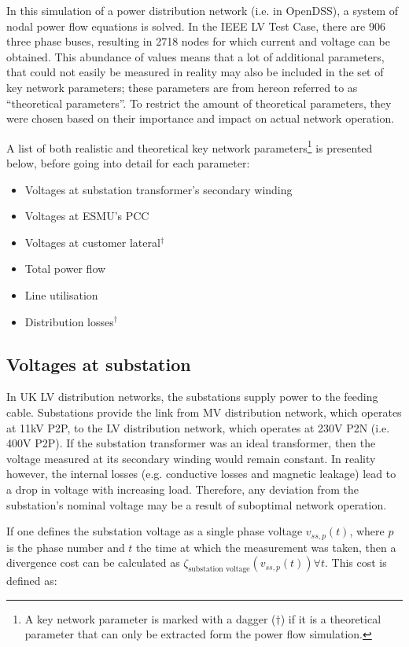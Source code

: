 In this simulation of a power distribution network (i.e. in OpenDSS), a system of nodal power flow equations is solved.
In the IEEE LV Test Case, there are 906 three phase buses, resulting in 2718 nodes for which current and voltage can be obtained.
This abundance of values means that a lot of additional parameters, that could not easily be measured in reality may also be included in the set of key network parameters; these parameters are from hereon referred to as ``theoretical parameters''.
To restrict the amount of theoretical parameters, they were chosen based on their importance and impact on actual network operation.

A list of both realistic and theoretical key network parameters\footnote{A key network parameter is marked with a dagger ($\dagger$) if it is a theoretical parameter that can only be extracted form the power flow simulation.} is presented below, before going into detail for each parameter:

\begin{itemize}
	\item Voltages at substation transformer's secondary winding
	\item Voltages at ESMU's PCC
	\item Voltages at customer lateral$^{\dagger}$
	\item Total power flow
	\item Line utilisation
	\item Distribution losses$^{\dagger}$
\end{itemize}

\subsection{Voltages at substation}
\label{ch1:subsec:voltages-at-substation}

In UK LV distribution networks, the substations supply power to the feeding cable.
Substations provide the link from MV distribution network, which operates at 11kV P2P, to the LV distribution network, which operates at 230V P2N (i.e. 400V P2P).
If the substation transformer was an ideal transformer, then the voltage measured at its secondary winding would remain constant.
In reality however, the internal losses (e.g. conductive losses and magnetic leakage) lead to a drop in voltage with increasing load.
Therefore, any deviation from the substation's nominal voltage may be a result of suboptimal network operation.

If one defines the substation voltage as a single phase voltage $v_{ss,p}(t)$, where $p$ is the phase number and $t$ the time at which the measurement was taken, then a divergence cost can be calculated as $\zeta_\text{substation voltage}(v_{ss,p}(t)) \forall t$.
This cost is defined as:

